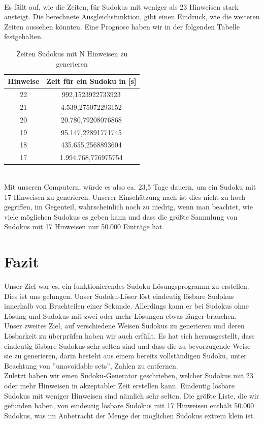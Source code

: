 \documentclass[11pt,a4paper]{article}
\begin{document}
\ \\
Es fällt auf, wie die Zeiten, für Sudokus mit weniger als 23 Hinweisen stark ansteigt. Die berechnete Ausgleichsfunktion, gibt einen Eindruck, wie die weiteren Zeiten aussehen könnten. Eine Prognose haben wir in der folgenden Tabelle festgehalten.
\ \\
\begin{table}[htbp!]
\begin{center} 
\begin{tabular}{|*{2}{c|}}
\hline 
Hinweise & Zeit für ein Sudoku in [s]\\ \hline 
22 & 992,1523922733923 \\ \hline 
 21 & 4.539,275072293152 \\ \hline 
 20 & 20.780,79208076868 \\ \hline 
 19 & 95.147,22891771745 \\ \hline 
 18 & 435.655,2568893604 \\ \hline 
 17 & 1.994.768,776975754 \\ \hline 
 \end{tabular}
 \end{center}
  \caption{Zeiten Sudokus mit N Hinweisen zu generieren } 
\end{table}
\ \\
Mit unseren Computern, würde es also ca. 23,5 Tage dauern, um ein Sudoku mit 17 Hinweisen zu generieren. Unserer Einschätzung nach ist dies nicht zu hoch gegriffen, im Gegenteil, wahrscheinlich noch zu niedrig, wenn man beachtet, wie viele möglichen Sudokus es geben kann und dass die größte Sammlung von Sudokus mit 17 Hinweisen nur 50.000 Einträge hat.
\ \\   

\section{Fazit} 
Unser Ziel war es, ein funktionierendes Sudoku-Lösungsprogramm zu erstellen. Dies ist uns gelungen. Unser Sudoku-Löser löst eindeutig lösbare Sudokus innerhalb von Bruchteilen einer Sekunde. Allerdings kann er bei Sudokus ohne Lösung und Sudokus mit zwei oder mehr Lösungen etwas länger brauchen.\\
Unser zweites Ziel, auf verschiedene Weisen Sudokus zu generieren und deren Lösbarkeit zu überprüfen haben wir auch erfüllt. Es hat sich herausgestellt, dass eindeutig lösbare Sudokus sehr selten sind und dass die zu bevorzugende Weise sie zu generieren, darin besteht aus einem bereits vollständigen Sudoku, unter Beachtung von ''unavoidable sets'', Zahlen zu entfernen.\\
Zuletzt haben wir einen Sudoku-Generator geschrieben, welcher Sudokus mit 23 oder mehr Hinweisen in akzeptabler Zeit erstellen kann. Eindeutig lösbare Sudokus mit weniger Hinweisen sind nämlich sehr selten. Die größte Liste, die wir gefunden haben, von eindeutig lösbare Sudokus mit 17 Hinweisen enthält 50.000 Sudokus, was im Anbetracht der Menge der möglichen Sudokus extrem klein ist.
\end{document}
